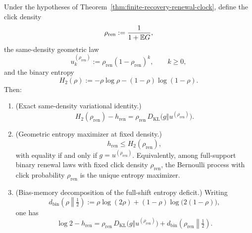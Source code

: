 \begin{theorem}\label{thm:renewal-density-decomposition}
Under the hypotheses of Theorem~\ref{thm:finite-recovery-renewal-clock}, define the click density
\[
\rho_{\mathrm{ren}}
:=
\frac{1}{1+\mathbb{E} G},
\]
the same-density geometric law
\[
u^{(\rho_{\mathrm{ren}})}_k
:=
\rho_{\mathrm{ren}}(1-\rho_{\mathrm{ren}})^k,
\qquad k\ge 0,
\]
and the binary entropy
\[
H_2(\rho):=-\rho\log\rho-(1-\rho)\log(1-\rho).
\]
Then:
\begin{enumerate}[label=\textup{(\roman*)},leftmargin=*,itemsep=4pt]
\item \textup{(Exact same-density variational identity.)}
\begin{equation}\label{eq:renewal-density-kl}
H_2(\rho_{\mathrm{ren}})-h_{\mathrm{ren}}
=
\rho_{\mathrm{ren}}\,
D_{\mathrm{KL}}\!\bigl(g\Vert u^{(\rho_{\mathrm{ren}})}\bigr).
\end{equation}
\item \textup{(Geometric entropy maximizer at fixed density.)}
\begin{equation}\label{eq:renewal-density-maxentropy}
h_{\mathrm{ren}}\le H_2(\rho_{\mathrm{ren}}),
\end{equation}
with equality if and only if $g=u^{(\rho_{\mathrm{ren}})}$. Equivalently, among full-support binary renewal laws with fixed click density $\rho_{\mathrm{ren}}$, the Bernoulli process with click probability $\rho_{\mathrm{ren}}$ is the unique entropy maximizer.
\item \textup{(Bias-memory decomposition of the full-shift entropy deficit.)} Writing
\[
d_{\mathrm{bin}}\!\left(\rho\middle\Vert \tfrac12\right)
:=
\rho\log(2\rho)+(1-\rho)\log\bigl(2(1-\rho)\bigr),
\]
one has
\begin{equation}\label{eq:renewal-density-deficit-split}
\log 2-h_{\mathrm{ren}}
=
\rho_{\mathrm{ren}}\,
D_{\mathrm{KL}}\!\bigl(g\Vert u^{(\rho_{\mathrm{ren}})}\bigr)
+
d_{\mathrm{bin}}\!\left(\rho_{\mathrm{ren}}\middle\Vert \tfrac12\right).
\end{equation}
\end{enumerate}
\end{theorem}

